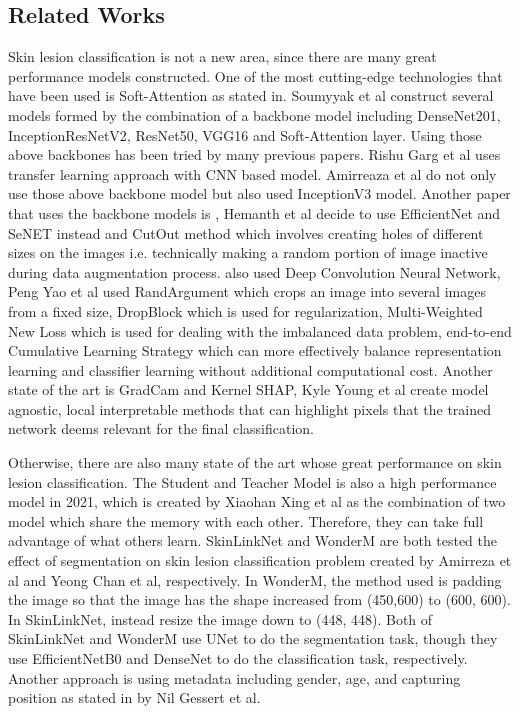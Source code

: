 \documentclass[sensors,article,submit,pdftex,moreauthors]{Definitions/mdpi}
\begin{document}
\subsection{Related Works}
Skin lesion classification is not a new area, since there are many great performance models constructed. One of the most cutting-edge technologies that have been used is Soft-Attention as stated in\cite{03358}. Soumyyak et al construct several models formed by the combination of a backbone model including DenseNet201\cite{06993}, InceptionResNetV2\cite{00567}, ResNet50\cite{03385}\cite{05027}, VGG16\cite{1556} and Soft-Attention layer. Using those above backbones has been tried by many previous papers. Rishu Garg et al \cite{03798} uses transfer learning approach with CNN based model. Amirreaza et al \cite{10348} do not only use those above backbone model but also used InceptionV3\cite{00567} model. Another paper that uses the backbone models is \cite{09418}, Hemanth et al decide to use EfficientNet\cite{11946} and SeNET\cite{01507} instead and CutOut\cite{04552v2} method which involves creating holes of different sizes on the images i.e. technically making a random portion of image inactive during data augmentation process. \cite{01284} also used Deep Convolution Neural Network, Peng Yao et al used RandArgument which crops an image into several images from a fixed size, DropBlock which is used for regularization, Multi-Weighted New Loss which is used for dealing with the imbalanced data problem, end-to-end Cumulative Learning Strategy which can more effectively balance representation learning and classifier learning without additional computational cost. Another state of the art is GradCam and Kernel SHAP\cite{06612}, Kyle Young et al create model agnostic, local interpretable methods that can highlight pixels that the trained network deems relevant for the final classification.

Otherwise, there are also many state of the art whose great performance on skin lesion classification. The Student and Teacher Model is also a high performance model in 2021\cite{03225}, which is created by Xiaohan Xing et al as the combination of two model which share the memory with each other. Therefore, they can take full advantage of what others learn. SkinLinkNet\cite{12602} and WonderM\cite{03426} are both tested the effect of segmentation on skin lesion classification problem created by Amirreza et al and Yeong Chan et al, respectively. In WonderM, the method used is padding the image so that the image has the shape increased from (450,600) to (600, 600). In SkinLinkNet, instead resize the image down to (448, 448). Both of SkinLinkNet and WonderM use UNet to do the segmentation task, though they use EfficientNetB0 and DenseNet to do the classification task, respectively. Another approach is using metadata including gender, age, and capturing position as stated in \cite{03910} by Nil Gessert et al. 
\end{document}
